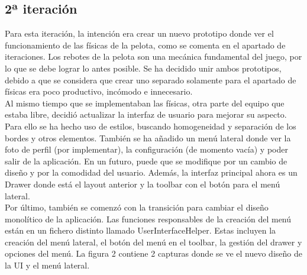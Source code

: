 \documentclass[a4paper,openright,12pt]{article}
\begin{document}
\subsection{2ª iteración}
Para esta iteración, la intención era crear un nuevo prototipo donde ver el funcionamiento de las físicas de la pelota, como se comenta en el apartado de iteraciones. Los rebotes de la pelota son una mecánica fundamental del juego, por lo que se debe lograr lo antes posible. Se ha decidido unir ambos prototipos, debido a que se considera que crear uno separado solamente para el apartado de físicas era poco productivo, incómodo e innecesario. \\ 
Al mismo tiempo que se implementaban las físicas, otra parte del equipo que estaba libre, decidió actualizar la interfaz de usuario para mejorar su aspecto. Para ello se ha hecho uso de estilos, buscando homogeneidad y separación de los bordes y otros elementos. También se ha añadido un menú lateral donde ver la foto de perfil (por implementar), la configuración (de momento vacía) y poder salir de la aplicación. En un futuro, puede que se modifique por un cambio de diseño y por la comodidad del usuario. Además, la interfaz principal ahora es un Drawer donde está el layout anterior y la toolbar con el botón para el menú lateral.\\ 
Por último, también se comenzó con la transición para cambiar el diseño monolítico de la aplicación. Las funciones responsables de la creación del menú están en un fichero distinto llamado UserInterfaceHelper. Estas incluyen la creación del menú lateral, el botón del menú en el toolbar, la gestión del drawer y opciones del menú.
La figura 2 contiene 2 capturas donde se ve el nuevo diseño de la UI y el menú lateral.
\end{document}
